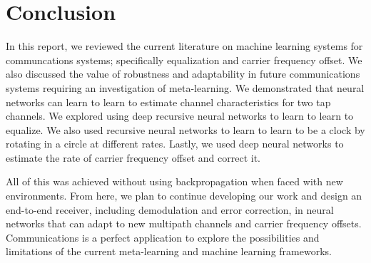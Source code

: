 \chapter{Conclusion}

In this report, we reviewed the current literature on machine learning systems for communcations systems; specifically equalization and carrier frequency offset.  We also discussed the value of robustness and adaptability in future communications systems requiring an investigation of meta-learning.
We demonstrated that neural networks can learn to learn to estimate channel characteristics for two tap channels.  We explored using deep recursive neural networks to learn to learn to equalize.
We also used recursive neural networks to learn to learn to be a clock by rotating in a circle at different rates.  Lastly, we used deep neural networks to estimate the rate of carrier frequency offset and correct it.

All of this was achieved without using backpropagation when faced with new environments.
From here, we plan to continue developing our work and design an end-to-end receiver, including demodulation and error correction, in neural networks that can adapt to new multipath channels and carrier frequency offsets. 
Communications is a perfect application to explore the possibilities and limitations of the current meta-learning and machine learning frameworks.  
